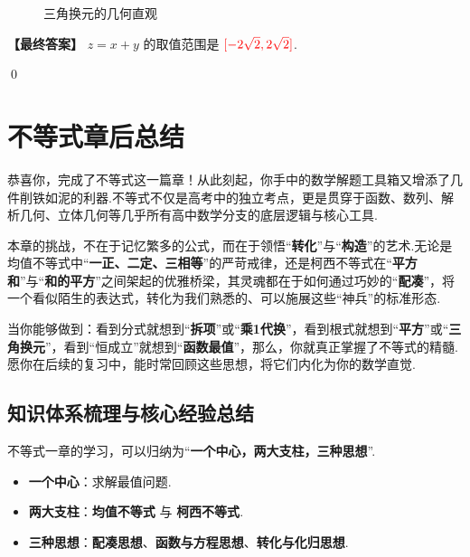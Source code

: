 \begin{solution}
\begin{figure}[H]
		\caption{三角换元的几何直观}
	\end{figure}
	
	\textbf{【最终答案】} $z=x+y$ 的取值范围是 $\textcolor{red}{[-2\sqrt{2}, 2\sqrt{2}]}$.
\end{solution}
\qed

\section*{不等式章后总结}

\lettrine{恭}{喜你}，完成了不等式这一篇章！从此刻起，你手中的数学解题工具箱又增添了几件削铁如泥的利器.不等式不仅是高考中的独立考点，更是贯穿于函数、数列、解析几何、立体几何等几乎所有高中数学分支的底层逻辑与核心工具.

本章的挑战，不在于记忆繁多的公式，而在于领悟“\textbf{转化}”与“\textbf{构造}”的艺术.无论是均值不等式中“\textbf{一正、二定、三相等}”的严苛戒律，还是柯西不等式在“\textbf{平方和}”与“\textbf{和的平方}”之间架起的优雅桥梁，其灵魂都在于如何通过巧妙的“\textbf{配凑}”，将一个看似陌生的表达式，转化为我们熟悉的、可以施展这些“神兵”的标准形态.

当你能够做到：看到分式就想到“\textbf{拆项}”或“\textbf{乘1代换}”，看到根式就想到“\textbf{平方}”或“\textbf{三角换元}”，看到“恒成立”就想到“\textbf{函数最值}”，那么，你就真正掌握了不等式的精髓.愿你在后续的复习中，能时常回顾这些思想，将它们内化为你的数学直觉.

\subsection*{知识体系梳理与核心经验总结}

\begin{note}[核心框架]
	不等式一章的学习，可以归纳为“\textbf{一个中心，两大支柱，三种思想}”.
	\begin{itemize}
		\item \textbf{一个中心}：求解最值问题.
		\item \textbf{两大支柱}：\textbf{均值不等式} 与 \textbf{柯西不等式}.
		\item \textbf{三种思想}：\textbf{配凑思想}、\textbf{函数与方程思想}、\textbf{转化与化归思想}.
	\end{itemize}
\end{note}

